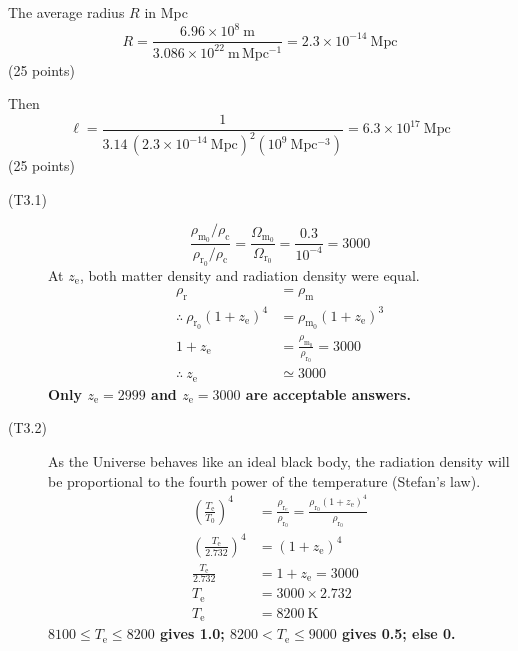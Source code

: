 The average radius $R$ in Mpc
\[
R = \frac{6.96\times10^{8}\ \mathrm{m}}
  {3.086\times10^{22}\ \mathrm{m\,Mpc^{-1}}}
= 2.3\times10^{-14}\ \mathrm{Mpc}
\]
\hfill(25 points)

Then
\[
\ell = \frac{1}
  {3.14\,(2.3\times10^{-14}\ \mathrm{Mpc})^2 (10^{9}\ \mathrm{Mpc^{-3}})}
= 6.3\times10^{17}\ \mathrm{Mpc}
\]
\hfill(25 points)

\begin{description}
\item[(T3.1)]
\[
\frac{\rho_{\mathrm{m_0}}/\rho_{\mathrm{c}}}{\rho_{\mathrm{r_0}}/\rho_{\mathrm{c}}}
= \frac{\Omega_{\mathrm{m_0}}}{\Omega_{\mathrm{r_0}}}
= \frac{0.3}{10^{-4}} = 3000
\]
At $z_{\mathrm{e}}$, both matter density and radiation density were equal.
\begin{align*}
\rho_{\mathrm{r}} &= \rho_{\mathrm{m}}\\
\therefore\ \rho_{\mathrm{r_0}}(1+z_{\mathrm{e}})^4
  &= \rho_{\mathrm{m_0}}(1+z_{\mathrm{e}})^3\\
1+z_{\mathrm{e}} &= \frac{\rho_{\mathrm{m_0}}}{\rho_{\mathrm{r_0}}} = 3000
  \tag*{(2.0)}\\
\therefore\ z_{\mathrm{e}} &\simeq 3000 \tag*{(1.0)}
\end{align*}
\textbf{Only $z_{\mathrm{e}} = 2999$ and $z_{\mathrm{e}} = 3000$ are
acceptable answers.}

\item[(T3.2)] As the Universe behaves like an ideal black body, the radiation
density will be proportional to the fourth power of the temperature (Stefan's
law).
\begin{align*}
\left(\frac{T_{\mathrm{e}}}{T_0}\right)^4
  &= \frac{\rho_{\mathrm{r_e}}}{\rho_{\mathrm{r_0}}}
   = \frac{\rho_{\mathrm{r_0}}(1+z_{\mathrm{e}})^4}{\rho_{\mathrm{r_0}}}
  \tag*{(2.0)}\\
\left(\frac{T_{\mathrm{e}}}{2.732}\right)^4
  &= (1+z_{\mathrm{e}})^4 \tag*{(1.0)}\\
\frac{T_{\mathrm{e}}}{2.732} &= 1+z_{\mathrm{e}} = 3000\\
T_{\mathrm{e}} &= 3000\times2.732\\
T_{\mathrm{e}} &= 8200\ \mathrm{K} \tag*{(1.0)}
\end{align*}
\textbf{$8100 \le T_{\mathrm{e}} \le 8200$ gives 1.0;
$8200 < T_{\mathrm{e}} \le 9000$ gives 0.5; else 0.}


\end{description}
